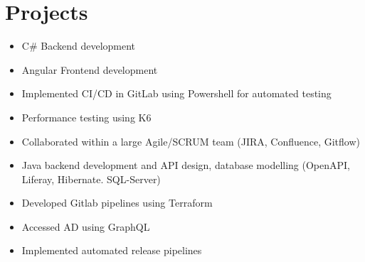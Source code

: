 \section{Projects}
\begin{itemize}
    \item C\# Backend development
    \item Angular Frontend development
    \item Implemented CI/CD in GitLab using Powershell for automated testing
    \item Performance testing using K6
\end{itemize}
\dottedline
{}
\begin{itemize}
    \item Collaborated within a large Agile/SCRUM team (JIRA, Confluence, Gitflow)
    \item Java backend development and API design, database modelling (OpenAPI, Liferay, Hibernate. SQL-Server)
\end{itemize}
\dottedline
{}
\begin{itemize}
    \item Developed Gitlab pipelines using Terraform
    \item Accessed AD using GraphQL
    \item Implemented automated release pipelines
\end{itemize}
